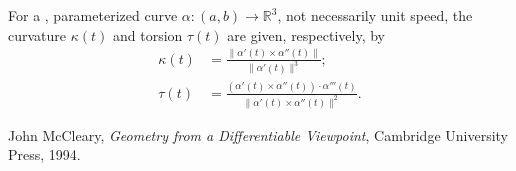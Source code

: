 \documentclass[12pt]{article}
\begin{document}
For a , parameterized curve $\alpha\colon (a,b)\to\mathbb R^3$, not necessarily unit speed, the curvature $\kappa(t)$ and torsion $\tau(t)$ are given, respectively,  by
\begin{align*}
\kappa(t)&=\frac{\|\alpha'(t)\times\alpha''(t)\|}{\|\alpha'(t)\|^3};\\
\tau(t)&=\frac{(\alpha'(t)\times\alpha''(t))\cdot\alpha'''(t)}{\|\alpha'(t)\times\alpha''(t)\|^2}.
\end{align*}

\begin{thebibliography}
{} John McCleary, \emph{Geometry from a Differentiable Viewpoint}, Cambridge University Press, 1994.
\end{thebibliography}
\end{document}
